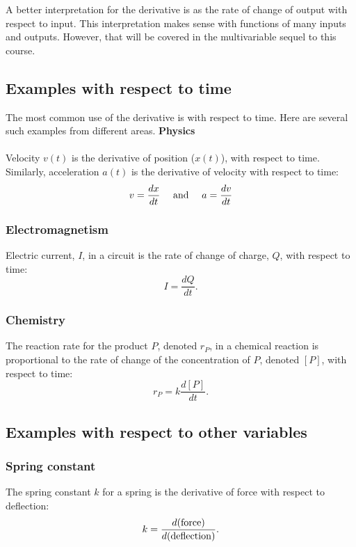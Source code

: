 \documentclass[twoside,openright,titlepage,a4paper]{book}
\begin{document}
\begin{sloppypar}
A better interpretation for the derivative is as the rate of change of output with respect to input. This interpretation makes sense with functions of many inputs and outputs. However, that will be covered in the multivariable sequel to this course.

\subsection{Examples with respect to time}

The most common use of the derivative is with respect to time. Here are several such examples from different areas.
\bigbreak
\noindent \textbf{Physics}\\\\
Velocity $v(t)$ is the derivative of position ($x(t)$), with respect to time. Similarly, acceleration $a(t)$ is the derivative of velocity with respect to time:
\[ v = \frac{dx}{dt} \quad \hbox{ and } \quad a = \frac{dv}{dt} \]

\subsubsection{Electromagnetism}

Electric current, $I$, in a circuit is the rate of change of charge, $Q$, with respect to time:
\[ I = \frac{dQ}{dt}. \]

\subsubsection{Chemistry}

The reaction rate for the product $P$, denoted $r_P$, in a chemical reaction is proportional to the rate of change of the concentration of $P$, denoted $\left[P\right]$, with respect to time:
\[ r_P = k \frac{d[P]}{dt}. \]

\subsection{Examples with respect to other variables}

\subsubsection{Spring constant}

The spring constant $k$ for a spring is the derivative of force with respect to deflection:
\[ k = \frac{d(\hbox{force})}{d(\hbox{deflection})}. \]


\end{sloppypar}
\end{document}
